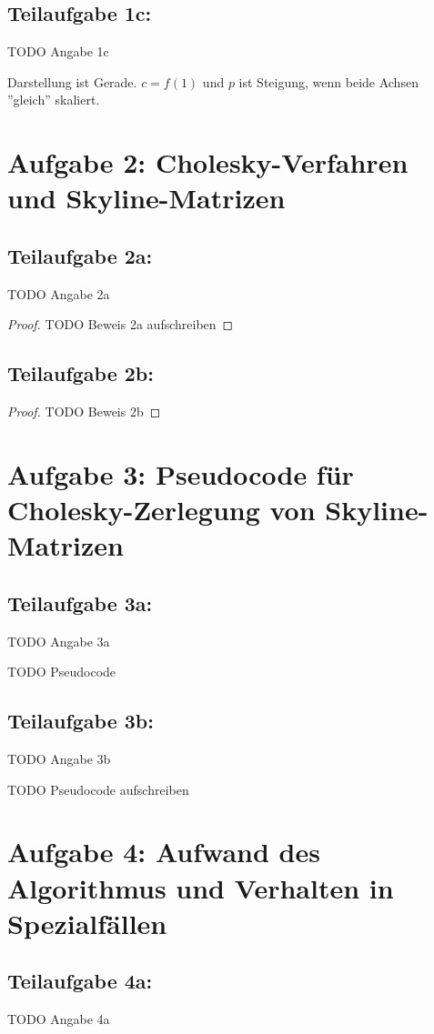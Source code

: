 \documentclass[]{article}
\begin{document}
\subsection*{Teilaufgabe 1c:}
TODO Angabe 1c

Darstellung ist Gerade. $c = f(1)$ und $p$ ist Steigung, wenn beide Achsen ''gleich'' skaliert.

\section*{Aufgabe 2: Cholesky-Verfahren und Skyline-Matrizen}
\subsection*{Teilaufgabe 2a:}
TODO Angabe 2a

\begin{proof}
	TODO Beweis 2a aufschreiben
\end{proof}

\subsection*{Teilaufgabe 2b:}

\begin{proof}
	TODO Beweis 2b
\end{proof}

\section*{Aufgabe 3: Pseudocode für Cholesky-Zerlegung von Skyline-Matrizen}
\subsection{Teilaufgabe 3a:}
TODO Angabe 3a

TODO Pseudocode

\subsection*{Teilaufgabe 3b:}
TODO Angabe 3b

TODO Pseudocode aufschreiben

\section*{Aufgabe 4: Aufwand des Algorithmus und Verhalten in Spezialfällen}
\subsection*{Teilaufgabe 4a:}
TODO Angabe 4a
\end{document}
